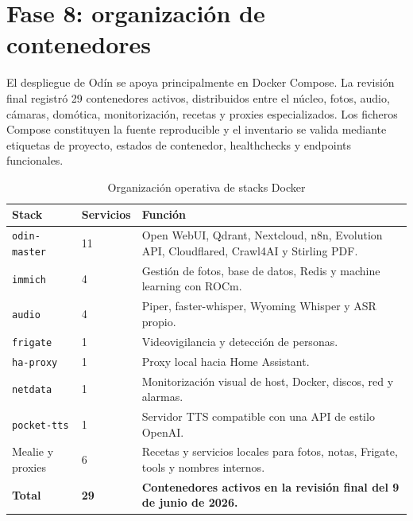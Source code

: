 \section{Fase 8: organización de contenedores}
El despliegue de Odín se apoya principalmente en Docker Compose. La revisión final registró 29 contenedores activos, distribuidos entre el núcleo, fotos, audio, cámaras, domótica, monitorización, recetas y proxies especializados. Los ficheros Compose constituyen la fuente reproducible y el inventario se valida mediante etiquetas de proyecto, estados de contenedor, healthchecks y endpoints funcionales.

\begin{table}[H]
  \centering
  \caption{Organización operativa de stacks Docker}
  \label{tab:docker-stacks}
  \begin{tabularx}{\textwidth}{l l X}
    \toprule
    Stack & Servicios & Función \\
    \midrule
    \texttt{odin-master} & 11 & Open WebUI, Qdrant, Nextcloud, n8n, Evolution API, Cloudflared, Crawl4AI y Stirling PDF. \\
    \texttt{immich} & 4 & Gestión de fotos, base de datos, Redis y machine learning con ROCm. \\
    \texttt{audio} & 4 & Piper, faster-whisper, Wyoming Whisper y ASR propio. \\
    \texttt{frigate} & 1 & Videovigilancia y detección de personas. \\
    \texttt{ha-proxy} & 1 & Proxy local hacia Home Assistant. \\
    \texttt{netdata} & 1 & Monitorización visual de host, Docker, discos, red y alarmas. \\
    \texttt{pocket-tts} & 1 & Servidor TTS compatible con una API de estilo OpenAI. \\
    Mealie y proxies & 6 & Recetas y servicios locales para fotos, notas, Frigate, tools y nombres internos. \\
    \midrule
    \textbf{Total} & \textbf{29} & \textbf{Contenedores activos en la revisión final del 9 de junio de 2026.} \\
    \bottomrule
  \end{tabularx}
\end{table}

